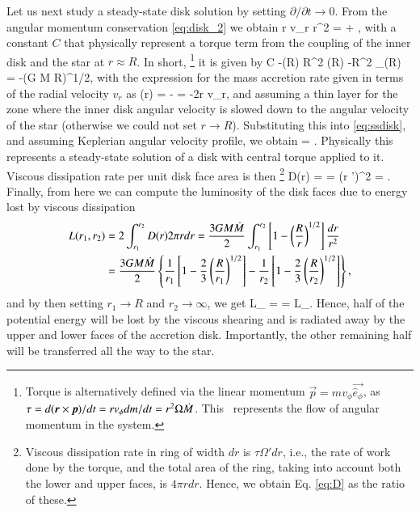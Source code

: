 Let us next study a steady-state disk solution by setting $\partial/\partial t \rightarrow 0$.
From the angular momentum conservation \eqref{eq:disk_2} we obtain
\be\label{eq:ssdisk}
r \Sigma v_{r} r^2 \Omega = \frac{\tau}{2\pi} + ,
\ee
with a constant $C$ that physically represent a torque term from the coupling of the inner disk and the star at $r \approx R$.
In short,%
\footnote{Torque is alternatively defined via the linear momentum $\vec{p} = m v_{\phi} \vec{\hat{e}_{\phi}}$, as $\tau = d(\boldsymbol{r} \times \boldsymbol{p})/dt = r v_{\phi} dm/dt = r^2 \Omega \dot{M}$. 
This  represents the flow of angular momentum in the system.
}
it is given by
\be\label{eq:visc_torque}
C \approx -\Mdot(R) R^2 \Omega(R) \approx -\Mdot R^2 \Omega_{}(R) = -\Mdot (G M R)^{1/2},
\ee
with the expression for the mass accretion rate given in terms of the radial velocity $v_r$ as
\be
\Mdot(r) = - = -2\pi r \Sigma v_r,
\ee
and assuming a thin layer for the zone where the inner disk angular velocity is slowed down to the angular velocity of the star (otherwise we could not set $r \rightarrow R$).
Substituting this into \eqref{eq:ssdisk}, and assuming Keplerian angular velocity profile, we obtain
\be
\nu \Sigma = \frac{\Mdot}{3\pi} .
\ee
Physically this represents a steady-state solution of a disk with central torque applied to it.
Viscous dissipation rate per unit disk face area is then%
\footnote{Viscous dissipation rate in ring of width $dr$ is $\tau \Omega' dr$, i.e., the rate of work done by the torque, and the total area of the ring, taking into account both the lower and upper faces, is $4\pi r dr$. Hence, we obtain Eq. \eqref{eq:D} as the ratio of these.
}
\be\label{eq:D}
D(r) =  =  \nu \Sigma (r \Omega')^2 =  .
\ee
Finally, from here we can compute the luminosity of the disk faces due to energy lost by viscous dissipation
\begin{align}\begin{split}
    L(r_1, r_2)  &= 2 \int_{r_1}^{r_2} D(r) 2\pi r dr = \frac{3 G M \dot{M}}{2} \int_{r_1}^{r_2} \left[ 1 - \left( \frac{R}{r} \right)^{1/2} \right] \frac{dr}{r^2} \\
 & = \frac{3 G M \dot{M}}{2} \left\{ \frac{1}{r_1} \left[ 1 - \frac{2}{3}\left( \frac{R}{r_1} \right)^{1/2} \right] -  \frac{1}{r_2} \left[ 1 - \frac{2}{3}\left( \frac{R}{r_2} \right)^{1/2} \right] \right\}, 
\end{split}\end{align}
and by then setting $r_1 \rightarrow R$ and $r_2 \rightarrow \infty$, we get
\be
L_{} =  =  L_{}.
\ee
Hence, half of the potential energy will be lost by the viscous shearing and is radiated away by the upper and lower faces of the accretion disk.
Importantly, the other remaining half will be transferred all the way to the star.

